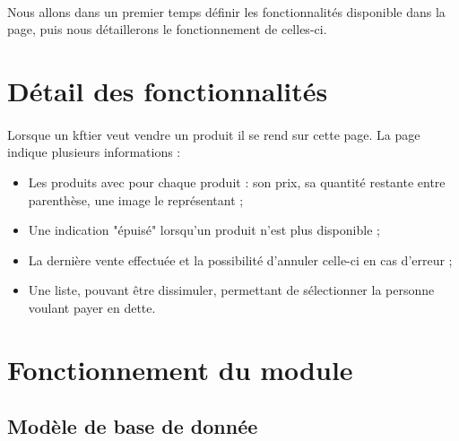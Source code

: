\documentclass[twoside,UTF8]{EPURapport}
\begin{document}
    \paragraph{}Nous allons dans un premier temps définir les fonctionnalités disponible dans la page, puis nous détaillerons le fonctionnement de celles-ci.

    \section{Détail des fonctionnalités}

        \paragraph{}Lorsque un kftier veut vendre un produit il se rend sur cette page. La page indique plusieurs informations : \\
            \begin{itemize}
                \item Les produits avec pour chaque produit : son prix, sa quantité restante entre parenthèse, une image le représentant ;\\
                \item Une indication "épuisé" lorsqu'un produit n'est plus disponible ;\\
                \item La dernière vente effectuée et la possibilité d'annuler celle-ci en cas d'erreur ;\\
                \item Une liste, pouvant être dissimuler, permettant de sélectionner la personne voulant payer en dette.\\
            \end{itemize}

    \section{Fonctionnement du module}

        \subsection{Modèle de base de donnée}
\end{document}
